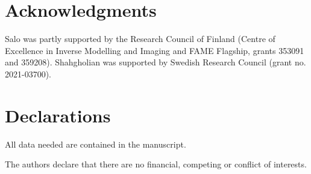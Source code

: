 \documentclass[11pt,a4paper]{amsart}
\theoremstyle{definition}
\numberwithin{equation}{section}
\newcommand{\mR}{\mathbb{R}}                    %
\newcommand{\p}{\partial}
\newcommand{\tbl}{\textcolor{blue}}
\newcommand{\mikko}[1]{\begin{quotation}[\textbf{\color{blue}Mikko's comment:\
		}{\color{blue}\textit{#1}}]\end{quotation}}
\newcommand{\henrik}[1]{\begin{quotation}[\textbf{\color{red}Henrik's comment:\
		}{\color{red}\textit{#1}}]\end{quotation}}
\begin{document}

\section*{Acknowledgments}

\noindent  
Salo was partly supported by the Research Council of Finland (Centre of Excellence in Inverse Modelling and Imaging and FAME Flagship, grants 353091 and 359208). Shahgholian was supported by Swedish Research Council (grant no. 2021-03700).

\section*{Declarations}

 All data needed are contained in the manuscript.

\medskip
{} The authors declare that there are no financial, competing or conflict of interests.
\end{document}
